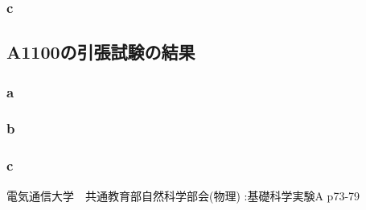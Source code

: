\documentclass[10pt,a4j]{jsarticle}
\begin{document}
    \subsubsection{c}
  \subsection{A1100の引張試験の結果}
    \subsubsection{a}
    \subsubsection{b}
    \subsubsection{c}
\begin{thebibliography}{3}
\bibitem{}電気通信大学　共通教育部自然科学部会(物理) :基礎科学実験A p73-79
\end{thebibliography}
\end{document}
